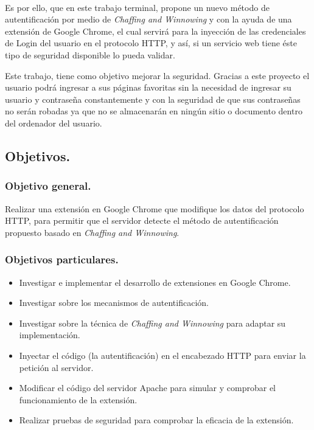 \documentclass[12pt, a4paper, titlepage]{article}
\begin{document}
		\paragraph {}
		Es por ello, que en este trabajo terminal, propone un nuevo método de autentificación por medio de \textit{Chaffing and Winnowing} y con la ayuda de una extensión de Google Chrome, el cual servirá para la inyección de las credenciales de Login del usuario en el protocolo HTTP, y así, si un servicio web tiene éste tipo de seguridad disponible lo pueda validar. 
		
		Este trabajo, tiene como objetivo mejorar la seguridad. Gracias a este proyecto el usuario podrá ingresar a sus páginas favoritas sin la necesidad de ingresar su usuario y contraseña constantemente y con la seguridad de que sus contraseñas no serán robadas ya que no se almacenarán en ningún sitio o documento dentro del ordenador del usuario.
		
		\newpage
			
		\subsection{Objetivos.}
			\subsubsection{Objetivo general. }
			Realizar una extensión en Google Chrome que modifique los datos del protocolo HTTP, para permitir que el servidor detecte el método de autentificación propuesto basado en \textit{Chaffing and Winnowing}.\\
			\subsubsection{Objetivos particulares.}
			\begin{itemize}
				\item Investigar e implementar el desarrollo de extensiones en Google Chrome.
				\item Investigar sobre los mecanismos de autentificación.
				\item Investigar sobre la técnica de \textit{Chaffing and Winnowing} para adaptar su implementación.
				\item Inyectar el código (la autentificación) en el encabezado HTTP para enviar la petición al servidor. 
				\item Modificar el código del servidor Apache para simular y comprobar el funcionamiento de la extensión.
				\item Realizar pruebas de seguridad para comprobar la eficacia de la extensión. 
			\end{itemize}
\end{document}
